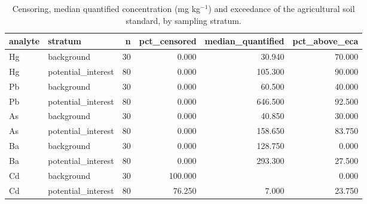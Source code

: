\begin{table}[htbp]
\centering
\caption{Censoring, median quantified concentration (mg kg$^{-1}$) and exceedance of the agricultural soil standard, by sampling stratum.}
\label{tab:stratum}
\footnotesize
\begin{tabular}{llrrrr}
\toprule
analyte & stratum & n & pct\_censored & median\_quantified & pct\_above\_eca \\
\midrule
Hg & background & 30 & 0.000 & 30.940 & 70.000 \\
Hg & potential\_interest & 80 & 0.000 & 105.300 & 90.000 \\
Pb & background & 30 & 0.000 & 60.500 & 40.000 \\
Pb & potential\_interest & 80 & 0.000 & 646.500 & 92.500 \\
As & background & 30 & 0.000 & 40.850 & 30.000 \\
As & potential\_interest & 80 & 0.000 & 158.650 & 83.750 \\
Ba & background & 30 & 0.000 & 128.750 & 0.000 \\
Ba & potential\_interest & 80 & 0.000 & 293.300 & 27.500 \\
Cd & background & 30 & 100.000 &  & 0.000 \\
Cd & potential\_interest & 80 & 76.250 & 7.000 & 23.750 \\
\bottomrule
\end{tabular}
\end{table}
